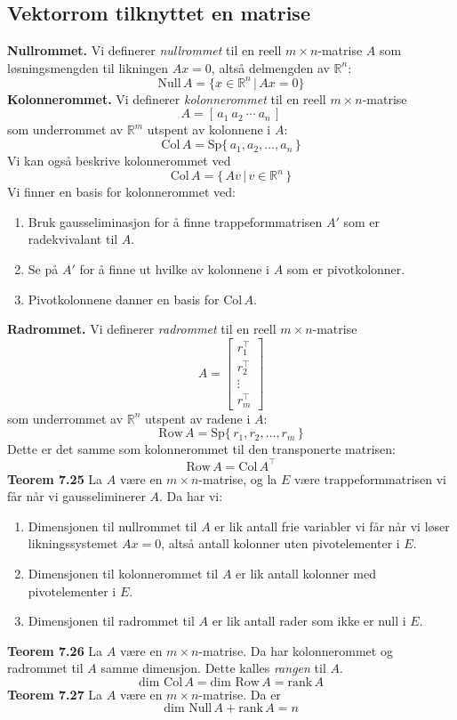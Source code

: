 \documentclass{article}
\begin{document}
\subsection{Vektorrom tilknyttet en matrise}
\textbf{Nullrommet.} Vi definerer \textit{nullrommet} til en reell $m \times n$-matrise $A$ som løsningsmengden til likningen $Ax = 0$, altså delmengden av $\mathbb{R}^n$:
\[ \text{Null}\,A = \{ x \in \mathbb{R}^n \,|\, Ax = 0 \} \]
\textbf{Kolonnerommet.} Vi definerer \textit{kolonnerommet} til en reell $m \times n$-matrise
\[ A = [\, a_1 \ a_2 \ \cdots \ a_n \,] \]
som underrommet av $\mathbb{R}^m$ utspent av kolonnene i $A$:
\[ \text{Col}\,A = \text{Sp} \{\, a_1, a_2, \dots, a_n \,\} \]
Vi kan også beskrive kolonnerommet ved
\[ \text{Col}\,A = \{\, Av \,|\, v \in \mathbb{R}^n \,\} \]
Vi finner en basis for kolonnerommet ved:
\begin{enumerate}
    \item Bruk gausseliminasjon for å finne trappeformmatrisen $A'$ som er radekvivalant til $A$.
    \item Se på $A'$ for å finne ut hvilke av kolonnene i $A$ som er pivotkolonner.
    \item Pivotkolonnene danner en basis for $\text{Col}\,A$.
\end{enumerate}
\textbf{Radrommet.} Vi definerer \textit{radrommet} til en reell $m \times n$-matrise
\[ A = \begin{bmatrix} r_1^\top \\ r_2^\top \\ \vdots \\ r_m^\top \end{bmatrix} \]
som underrommet av $\mathbb{R}^n$ utspent av radene i $A$:
\[ \text{Row}\,A = \text{Sp} \{\, r_1, r_2, \dots, r_m \,\} \]
Dette er det samme som kolonnerommet til den transponerte matrisen:
\[ \text{Row}\,A = \text{Col}\,A^\top \]
\textbf{Teorem 7.25} La $A$ være en $m \times n$-matrise, og la $E$ være trappeformmatrisen vi får når vi gausseliminerer $A$. Da har vi:
\begin{enumerate}
    \item Dimensjonen til nullrommet til $A$ er lik antall frie variabler vi får når vi løser likningssystemet $Ax = 0$, altså antall kolonner uten pivotelementer i $E$.
    \item Dimensjonen til kolonnerommet til $A$ er lik antall kolonner med pivotelementer i $E$.
    \item Dimensjonen til radrommet til $A$ er lik antall rader som ikke er null i $E$.
\end{enumerate}
\textbf{Teorem 7.26} La $A$ være en $m \times n$-matrise. Da har kolonnerommet og radrommet til $A$ samme dimensjon. Dette kalles \textit{rangen} til $A$.
\[ \text{dim Col}\,A = \text{dim Row}\,A = \text{rank}\,A\]
\textbf{Teorem 7.27} La $A$ være en $m \times n$-matrise. Da er
\[ \text{dim Null}\,A + \text{rank}\,A = n \]
\end{document}
